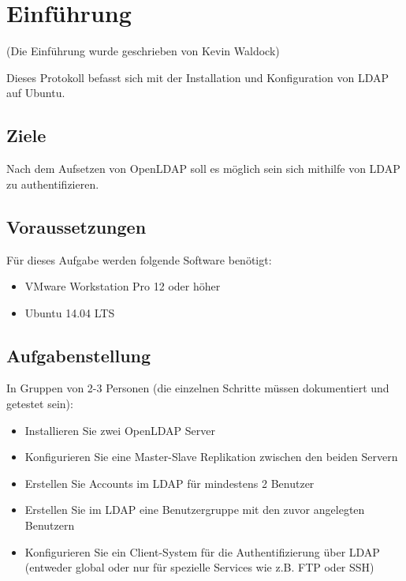
\section{Einführung}
(Die Einführung wurde geschrieben von Kevin Waldock)

Dieses Protokoll befasst sich mit der Installation und Konfiguration von LDAP auf Ubuntu. 

\subsection{Ziele}
Nach dem Aufsetzen von OpenLDAP soll es möglich sein sich mithilfe von LDAP zu authentifizieren.

\subsection{Voraussetzungen}
Für dieses Aufgabe werden folgende Software benötigt:

\begin{itemize}
	\item VMware Workstation Pro 12 oder höher
	\item Ubuntu 14.04 LTS
\end{itemize}

\subsection{Aufgabenstellung}

In Gruppen von 2-3 Personen (die einzelnen Schritte müssen dokumentiert und getestet sein):

\begin{itemize}
	\item Installieren Sie zwei OpenLDAP Server
	\item Konfigurieren Sie eine Master-Slave Replikation zwischen den beiden Servern
	\item Erstellen Sie Accounts im LDAP für mindestens 2 Benutzer
	\item Erstellen Sie im LDAP eine Benutzergruppe mit den zuvor angelegten Benutzern
	\item Konfigurieren Sie ein Client-System für die Authentifizierung über LDAP  (entweder global oder nur für spezielle Services wie z.B. FTP oder SSH)
\end{itemize}

\clearpage
